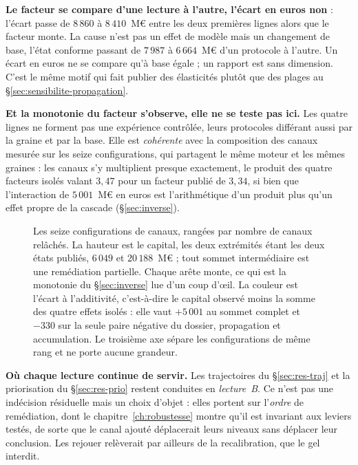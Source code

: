\begin{attention}
\textbf{Le facteur se compare d'une lecture à l'autre, l'écart en euros non} : l'écart passe de $8\,860$ à $8\,410$~M\euro{}
entre les deux premières lignes alors que le facteur monte. La cause n'est pas un effet de modèle
mais un changement de base, l'état conforme passant de $7\,987$ à $6\,664$~M\euro{} d'un
protocole à l'autre. Un écart en euros ne se compare qu'à base égale ; un rapport est sans
dimension. C'est le même motif qui fait publier des élasticités plutôt que des plages au
\S\ref{sec:sensibilite-propagation}.

\textbf{Et la monotonie du facteur s'observe, elle ne se teste pas ici.} Les quatre lignes ne
forment pas une expérience contrôlée, leurs protocoles différant aussi par la graine et par la
base. Elle est \emph{cohérente} avec la composition des canaux mesurée sur les seize
configurations, qui partagent le même moteur et les mêmes graines : les canaux s'y multiplient
presque exactement, le produit des quatre facteurs isolés valant $3{,}47$ pour un facteur publié
de $3{,}34$, si bien que l'interaction de $5\,001$~M\euro{} en euros est l'arithmétique d'un
produit plus qu'un effet propre de la cascade (\S\ref{sec:inverse}).
\end{attention}

\begin{figure}[htbp]\centering
{}
\caption{Les seize configurations de canaux, rangées par nombre de canaux relâchés. La hauteur
est le capital, les deux extrémités étant les deux états publiés, $6\,049$ et $20\,188$~M\euro{} ;
tout sommet intermédiaire est une remédiation partielle. Chaque arête monte, ce qui est la
monotonie du \S\ref{sec:inverse} lue d'un coup d'\oe{}il. La couleur est l'écart à l'additivité,
c'est-à-dire le capital observé moins la somme des quatre effets isolés : elle vaut $+5\,001$ au
sommet complet et $-330$ sur la seule paire négative du dossier, propagation et accumulation. Le
troisième axe sépare les configurations de même rang et ne porte aucune grandeur.}
\label{fig:treillis-canaux}
\end{figure}

\noindent\textbf{Où chaque lecture continue de servir.} Les trajectoires du
\S\ref{sec:res-traj} et la priorisation du \S\ref{sec:res-prio} restent conduites en
\emph{lecture~B}. Ce n'est pas une indécision résiduelle mais un choix d'objet : elles portent
sur l'\emph{ordre} de remédiation, dont le chapitre~\ref{ch:robustesse} montre qu'il est
invariant aux leviers testés, de sorte que le canal ajouté déplacerait leurs niveaux sans
déplacer leur conclusion. Les rejouer relèverait par ailleurs de la recalibration, que le gel
interdit.


